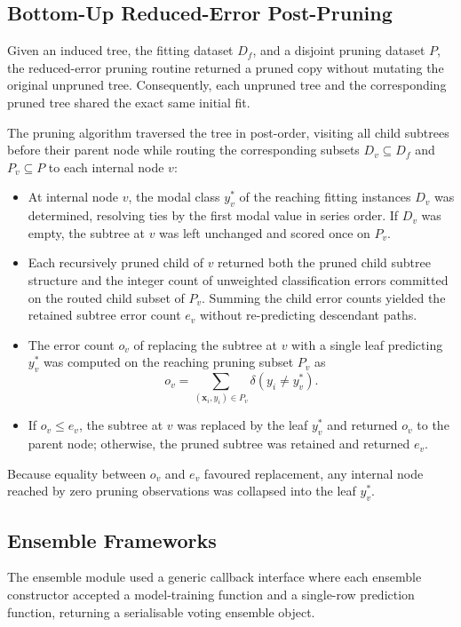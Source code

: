 \subsection{Bottom-Up Reduced-Error Post-Pruning}
\label{subsec:meth_pruning}
Given an induced tree, the fitting dataset $D_f$, and a disjoint pruning dataset $P$, the reduced-error pruning routine returned a pruned copy without mutating the original unpruned tree. Consequently, each unpruned tree and the corresponding pruned tree shared the exact same initial fit.

The pruning algorithm traversed the tree in post-order, visiting all child subtrees before their parent node while routing the corresponding subsets $D_v \subseteq D_f$ and $P_v \subseteq P$ to each internal node $v$:
\begin{itemize}
    \item At internal node $v$, the modal class $y^*_v$ of the reaching fitting instances $D_v$ was determined, resolving ties by the first modal value in series order. If $D_v$ was empty, the subtree at $v$ was left unchanged and scored once on $P_v$.
    \item Each recursively pruned child of $v$ returned both the pruned child subtree structure and the integer count of unweighted classification errors committed on the routed child subset of $P_v$. Summing the child error counts yielded the retained subtree error count $e_v$ without re-predicting descendant paths.
    \item The error count $o_v$ of replacing the subtree at $v$ with a single leaf predicting $y^*_v$ was computed on the reaching pruning subset $P_v$ as
    \begin{equation}
        o_v = \sum_{(\mathbf{x}_i, y_i) \in P_v} \delta(y_i \ne y^*_v).
        \label{eq:leaf_err}
    \end{equation}
    \item If $o_v \le e_v$, the subtree at $v$ was replaced by the leaf $y^*_v$ and returned $o_v$ to the parent node; otherwise, the pruned subtree was retained and returned $e_v$.
\end{itemize}
Because equality between $o_v$ and $e_v$ favoured replacement, any internal node reached by zero pruning observations was collapsed into the leaf $y^*_v$.

\subsection{Ensemble Frameworks}
\label{subsec:meth_ensemble}
The ensemble module used a generic callback interface where each ensemble constructor accepted a model-training function and a single-row prediction function, returning a serialisable voting ensemble object.


